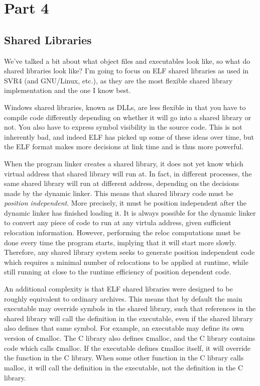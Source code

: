 \section{Part 4}
\subsection{Shared Libraries}

We've talked a bit about what object files and executables look like,
so what do shared libraries look like? I'm going to focus on ELF shared
libraries as used in SVR4 (and GNU/Linux, etc.), as they are the most
flexible shared library implementation and the one I know best.

Windows shared libraries, known as DLLs, are less flexible in that you
have to compile code differently depending on whether it will go into a
shared library or not. You also have to express symbol visibility in the
source code. This is not inherently bad, and indeed ELF has picked up
some of these ideas over time, but the ELF format makes more decisions
at link time and is thus more powerful.

When the program linker creates a shared library, it does not yet
know which virtual address that shared library will run at. In fact,
in different processes, the same shared library will run at different
address, depending on the decisions made by the dynamic linker. This
means that shared library code must be \emph{position independent}.
More precisely, it must be position independent after the dynamic
linker has finished loading it. It is always possible for the dynamic
linker to convert any piece of code to run at any virtula address,
given sufficient relocation information. However, performing the reloc
computations must be done every time the program starts, implying that
it will start more slowly. Therefore, any shared library system seeks to
generate position independent code which requires a minimal number of
relocations to be applied at runtime, while still running at close to
the runtime efficiency of position dependent code.

An additional complexity is that ELF shared libraries were designed
to be roughly equivalent to ordinary archives. This means that by
default the main executable may override symbols in the shared
library, such that references in the shared library will call the
definition in the executable, even if the shared library also
defines that same symbol. For example, an executable may define its
own version of \texttt{c}{malloc}. The C library also defines
\texttt{c}{malloc}, and the C library contains code which calls
\texttt{c}{malloc}. If the executable defines \texttt{c}{malloc}
itself, it will override the function in the C library. When some other
function in the C library calls malloc, it will call the definition in
the executable, not the definition in the C library.

